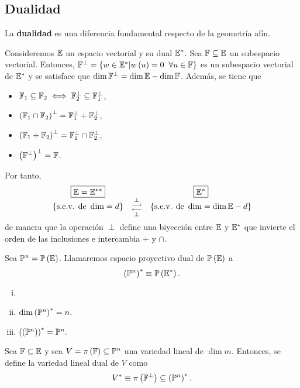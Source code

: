\subsection{Dualidad}
La \textbf{dualidad} es una diferencia fundamental respecto de la geometría afín.
\begin{rec}
    Consideremos $\mathbb{E}$ un espacio vectorial y su dual $\mathbb{E}^*$. Sea $\mathbb{F} \subseteq \mathbb{E}$ un subespacio vectorial. Entonces, $\F^\perp=\left\{w \in \E ^* | w \left( u \right) = 0 \hspace{0,2cm} \forall u\in\F \right\} $ es un subespacio vectorial de $\mathbb{E}^*$ y se satisface que $\dim \mathbb{F}^\perp = \dim \mathbb{E} - \dim \mathbb{F}$. Además, se tiene que
    \begin{itemize}
        \item $\mathbb{F}_1 \subseteq \mathbb{F}_2 \iff \mathbb{F}_2^\perp \subseteq \mathbb{F}_1^\perp$,
        \item $\left( \mathbb{F}_1 \cap \mathbb{F}_2 \right) ^\perp = \mathbb{F}_1^\perp + \mathbb{F}_2^\perp$,
        \item $\left( \mathbb{F}_1 + \mathbb{F}_2 \right)^\perp=\mathbb{F}_1^\perp \cap \mathbb{F}_2^\perp$,
        \item $\left( \mathbb{F}^\perp\right)^\perp=\mathbb{F}$.
    \end{itemize}
    Por tanto,
    \[
        \begin{array}{ccc}
             \boxed{\mathbb{E} = \mathbb{E}^{**}} & & \boxed{\mathbb{E}^*}\\
             \left\{\text{s.e.v. de }\dim = d \right\} & \substack{\perp \\ \longrightarrow \\  \longleftarrow \\ \perp} & \left\{\text{s.e.v. de }\dim = \dim \mathbb{E} - d \right\}
        \end{array}
    \]
    de manera que la operación $\perp$ define una biyección entre $\mathbb{E}$ y $\mathbb{E}^*$ que invierte el orden de las inclusiones e intercambia $+$ y $\cap$.
\end{rec}
\begin{defi}
    Sea $\mathbb{P}^n=\mathbb{P}\left(\mathbb{E}\right)$. Llamaremos espacio proyectivo dual de $\mathbb{P}\left(\mathbb{E}\right)$ a
    \[
        \left( \mathbb{P}^n \right)^* \equiv \mathbb{P}\left(\mathbb{E}^*\right).
    \]
\end{defi}
\begin{obs}
    \begin{enumerate}[i)]
        \item []
        \item $\dim \left( \mathbb{P} ^n \right) ^* = n$.
        \item $\left( \left( \mathbb{P} ^n \right) \right) ^* = \mathbb{P}^n. $
    \end{enumerate}
\end{obs}
\begin{defi}
    Sea $\mathbb{F}\subseteq \mathbb{E}$ y sea $V=\pi\left(\mathbb{F}\right)\subseteq\mathbb{P}^n$ una variedad lineal de $\dim m$. Entonces, se define la variedad lineal dual de $V$ como
    \[
        V^* \equiv \pi \left( \mathbb{F}^\perp\right) \subseteq \left( \mathbb{P}^n \right)^*.
    \]
    
\end{defi}

